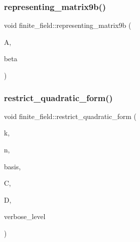 \mbox{\label{classfinite__field_a29d9b64c0ebf1d89be62536d6a4366e6}} 
\subsubsection{\texorpdfstring{representing\+\_\+matrix9b()}{representing\_matrix9b()}}
{\footnotesize\ttfamily void finite\+\_\+field\+::representing\+\_\+matrix9b (\begin{DoxyParamCaption}\item[{\mbox{\hyperlink{galois_8h_a09fddde158a3a20bd2dcadb609de11dc}{I\+NT}} $\ast$}]{A,  }\item[{\mbox{\hyperlink{galois_8h_a09fddde158a3a20bd2dcadb609de11dc}{I\+NT}}}]{beta }\end{DoxyParamCaption})}

\mbox{\label{classfinite__field_a8492a45cbf4387197b373d73897f0e93}} 
\subsubsection{\texorpdfstring{restrict\+\_\+quadratic\+\_\+form()}{restrict\_quadratic\_form()}}
{\footnotesize\ttfamily void finite\+\_\+field\+::restrict\+\_\+quadratic\+\_\+form (\begin{DoxyParamCaption}\item[{\mbox{\hyperlink{galois_8h_a09fddde158a3a20bd2dcadb609de11dc}{I\+NT}}}]{k,  }\item[{\mbox{\hyperlink{galois_8h_a09fddde158a3a20bd2dcadb609de11dc}{I\+NT}}}]{n,  }\item[{\mbox{\hyperlink{galois_8h_a09fddde158a3a20bd2dcadb609de11dc}{I\+NT}} $\ast$}]{basis,  }\item[{\mbox{\hyperlink{galois_8h_a09fddde158a3a20bd2dcadb609de11dc}{I\+NT}} $\ast$}]{C,  }\item[{\mbox{\hyperlink{galois_8h_a09fddde158a3a20bd2dcadb609de11dc}{I\+NT}} $\ast$}]{D,  }\item[{\mbox{\hyperlink{galois_8h_a09fddde158a3a20bd2dcadb609de11dc}{I\+NT}}}]{verbose\+\_\+level }\end{DoxyParamCaption})}

